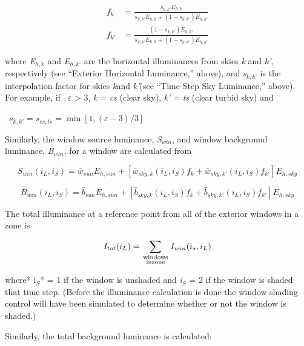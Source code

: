 \begin{equation}
  \begin{array}{rl}
    f_k    & = \frac{ s_{k,k'} E_{h,k} } { s_{k,k'} E_{h,k} + (1 - s_{k,k'})E_{h,k'}} \\
    f_{k'} & = \frac{ (1 - s_{k,k'} ) E_{h,k'} } { s_{k,k'} E_{h,k} + (1 - s_{k,k'} ) E_{h,k'}}
  \end{array}
\end{equation}

where \emph{E\(_{h,k}\)} and \emph{E\(_{h,k’}\)} are the horizontal illuminances from skies \emph{k} and \emph{k'}, respectively (see ``Exterior Horizontal Luminance,'' above), and \emph{s\(_{k,k’}\)} is the interpolation factor for skies \emph{k}and \emph{k'}(see ``Time-Step Sky Luminance,'' above).~ For example, if~ \emph{$\varepsilon$} \textgreater{} 3, \emph{k} = \emph{cs} (clear sky), \emph{k'} = \emph{ts} (clear turbid sky) and

~\(s_{k,k'} = s_{cs,ts} = \min [1,(\varepsilon - 3)/3]\)

Similarly, the window source luminance, \emph{S\(_{win}\)}, and window background luminance, \emph{B\(_{win}\)}, for a window are calculated from

\begin{equation}
{S_{win}}({i_L},{i_S}) = {\bar w_{sun}}{E_{h,sun}} + [{\bar w_{sky,k}}({i_L},{i_S}){f_k} + {\bar w_{sky,k'}}({i_L},{i_S}){f_{k'}}]{E_{h,sky}}
\end{equation}

\begin{equation}
{B_{win}}({i_L},{i_S}) = {\bar b_{sun}}{E_{h,sun}} + [{\bar b_{sky,k}}({i_L},{i_S}){f_k} + {\bar b_{sky,k'}}({i_L},{i_S}){f_{k'}}]{E_{h,sky}}
\end{equation}

The total illuminance at a reference point from all of the exterior windows in a zone is

\begin{equation}
{I_{tot}}({i_L}) = \sum\limits_{\scriptstyle{\rm{windows}}\atop\scriptstyle{\rm{in zone}}} {{I_{win}}({i_s},{i_L})}
\end{equation}

where* i\(_{S}\)* = 1 if the window is unshaded and \emph{i\(_{S}\)} = 2 if the window is shaded that time step. (Before the illuminance calculation is done the window shading control will have been simulated to determine whether or not the window is shaded.)

Similarly, the total background luminance is calculated:


